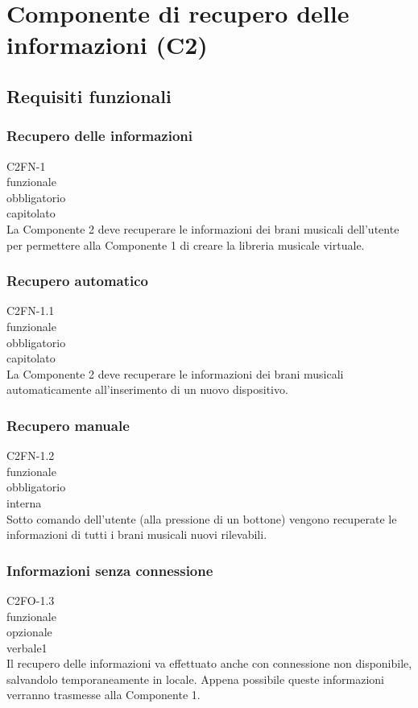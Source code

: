 
\section{Componente di recupero delle informazioni (C2)}

\subsection{Requisiti funzionali}
\subsubsection*{Recupero delle informazioni}
 C2FN-1 \\
 funzionale \\
 obbligatorio \\
 capitolato \\
La Componente 2 deve recuperare le informazioni dei brani musicali dell'utente
per permettere alla Componente 1 di creare la libreria musicale virtuale.

\subsubsection*{Recupero automatico}
 C2FN-1.1 \\
 funzionale \\
 obbligatorio \\
 capitolato \\
La Componente 2 deve recuperare le informazioni dei brani musicali
automaticamente all'inserimento di un nuovo dispositivo.

\subsubsection*{Recupero manuale}
 C2FN-1.2 \\
 funzionale \\
 obbligatorio \\
 interna \\
Sotto comando dell'utente (alla pressione di un bottone) vengono recuperate le
informazioni di tutti i brani musicali nuovi rilevabili.

\subsubsection*{Informazioni senza connessione}
 C2FO-1.3 \\
 funzionale \\
 opzionale \\
 verbale1 \\
Il recupero delle informazioni va effettuato anche con connessione non
disponibile, salvandolo temporaneamente in locale. Appena possibile queste
informazioni verranno trasmesse alla Componente 1.

